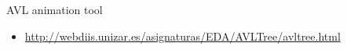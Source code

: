 \begin{frame}{AVL animation tool}
\begin{itemize}
\item \url{http://webdiis.unizar.es/asignaturas/EDA/AVLTree/avltree.html}
\end{itemize}
\end{frame}

